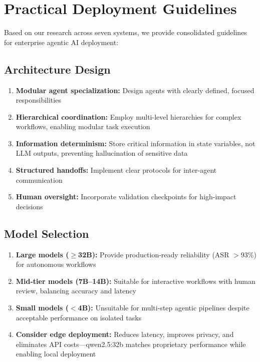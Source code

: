 
\section{Practical Deployment Guidelines}
\label{sec:agentic_guidelines}

Based on our research across seven systems, we provide consolidated guidelines for enterprise agentic AI deployment:

\subsection{Architecture Design}

\begin{enumerate}[leftmargin=*]
    \item \textbf{Modular agent specialization:} Design agents with clearly defined, focused responsibilities
    \item \textbf{Hierarchical coordination:} Employ multi-level hierarchies for complex workflows, enabling modular task execution
    \item \textbf{Information determinism:} Store critical information in state variables, not LLM outputs, preventing hallucination of sensitive data
    \item \textbf{Structured handoffs:} Implement clear protocols for inter-agent communication
    \item \textbf{Human oversight:} Incorporate validation checkpoints for high-impact decisions
\end{enumerate}

\subsection{Model Selection}

\begin{enumerate}[leftmargin=*]
    \item \textbf{Large models ($\geq$32B):} Provide production-ready reliability (ASR $>$93\%) for autonomous workflows
    \item \textbf{Mid-tier models (7B--14B):} Suitable for interactive workflows with human review, balancing accuracy and latency
    \item \textbf{Small models ($<$4B):} Unsuitable for multi-step agentic pipelines despite acceptable performance on isolated tasks
    \item \textbf{Consider edge deployment:} Reduces latency, improves privacy, and eliminates API costs---qwen2.5:32b matches proprietary performance while enabling local deployment
\end{enumerate}

